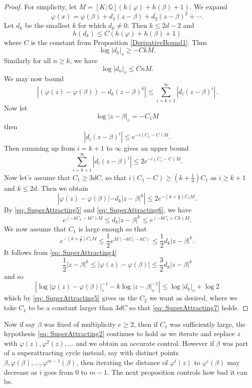 \documentclass[10pt, reqno]{amsart}
\newcommand{\bb}{\mathbb}
\newcommand{\vphi}{\varphi}
\numberwithin{theorem}{section}
\numberwithin{equation}{section}
\numberwithin{example}{section}
\numberwithin{definition}{section}
\begin{document}
\begin{proof}
For simplicity, let $M = [K;\bb{Q}](h(\vphi) + h(\beta)+1)$. We expand 
$$\vphi(x) = \vphi(\beta) + d_1(z-\beta) + d_2(z-\beta)^2 + \cdots.$$
Let $d_k$ be the smallest $k$ for which $d_k \not = 0$. Then $k \leq 2d-2$ and 
$$h(d_k) \leq C(h(\vphi) + h(\beta)+1)$$
where $C$ is the constant from Proposition \ref{DerivativeBound1}. Thus 
\begin{equation} \label{eq: SuperAttracting6}
\log |d_k|_v \geq - CkM.
\end{equation}
Similarly for all $n \geq k$, we have 
\begin{equation} \label{eq: SuperAttracting5}
\log |d_n|_v \leq Cn M.
\end{equation}
We may now bound 
$$\left|\left(\vphi(z) - \vphi(\beta) \right)  - d_k (z-\beta)^k \right| \leq \sum_{i=k+1}^{\infty} \left|d_i (z-\beta)^i \right|.$$
Now let
$$\log |z-\beta|_v = -C_1 M$$
then
$$|d_i (z-\beta)^i| \leq e^{-i (C_1 - C) M}.$$
Then summing up from $i=k+1$ to $\infty$ gives an upper bound 
$$\sum_{i=k+1}^{\infty} \left|d_i (z-\beta)^i \right| \leq 2 e^{-i(C_1 - C)M}.$$
Now let's assume that $C_1 \geq 3d C$, so that $i(C_1 - C) \geq (k+ \frac{1}{d})C_1$ as $i \geq k+1$ and $k \leq 2d$. Then we obtain 
\begin{equation} \label{eq: SuperAttracting4}
\left|\vphi(z) - \vphi(\beta)| - d_k |z-\beta|^k \right| \leq 2e^{-(k + \frac{1}{d})C_1 M}.
\end{equation}
By \eqref{eq: SuperAttracting5} and \eqref{eq: SuperAttracting6}, we have 
$$e^{(-kC_1 - kC)M} \leq d_k|z-\beta|^k \leq e^{(-kC_1 + Ck)M}.$$
We now assume that $C_1$ is large enough so that
\begin{equation} \label{eq: SuperAttracting7}
e^{-(k+\frac{1}{d})C_1 M} \leq \frac{1}{2} e^{M(-kC_1 - kC)} \leq \frac{1}{2} d_k |z-\beta|^k.
\end{equation}
It follows from \eqref{eq: SuperAttracting4}
$$ \frac{1}{2} |z-\beta|^k \leq |\vphi(z) - \vphi(\beta)| \leq \frac{3}{2} d_k |z-\beta|^k$$
and so
$$\left|\log |\vphi(z) - \vphi(\beta)|_v ^{-1} - k \log |z-\beta|^{-1}_v \right| \leq \log |d_k|_v + \log 2$$
which by \eqref{eq: SuperAttracting5} gives us the $C_2$ we want as desired, where we take $C_1$ to be a constant larger than $3dC$ so that \eqref{eq: SuperAttracting7} holds. 
\end{proof}

Now if say $\beta$ was fixed of multiplicity $e \geq 2$, then if $C_1$ was sufficiently large, the hypothesis \eqref{eq: SuperAttracting2} continues to hold as we iterate and replace $z$ with $\vphi(z),\vphi^2(z),\ldots$ and we obtain an accurate control. However if $\beta$ was part of a superattracting cycle instead, say with distinct points $\beta,\vphi(\beta),\ldots,\vphi^{m-1}(\beta)$, then iterating the distance of $\vphi^i(z)$ to $\vphi^i(\beta)$ may decrease as $i$ goes from $0$ to $m-1$. The next proposition controls how bad it can be. 
\end{document}
